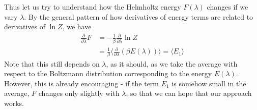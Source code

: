 \documentclass[a4paper, draft]{article}
\theoremstyle{own}
\theoremstyle{remark}
\begin{document}
Thus let us try to understand how the Helmholtz energy $F(\lambda)$ changes if we vary $\lambda$. By the general pattern of how derivatives of energy terms are related to derivatives of $\ln Z$, we have
\begin{align*}
\frac{\partial}{\partial \lambda} F &= - \frac{1}{\beta} \frac{\partial}{\partial \lambda} \ln Z \\
&= \frac{1}{\beta} \langle \frac{\partial}{\partial \lambda} (\beta E(\lambda))\rangle = \langle E_1 \rangle
\end{align*}
Note that this still depends on $\lambda$, as it should, as we take the average with respect to the Boltzmann distribution corresponding to the energy $E(\lambda)$. However, this is already encouraging - if the term $E_1$ is somehow small in the average, $F$ changes only slightly with $\lambda$, so that we can hope that our approach works. 
\end{document}
